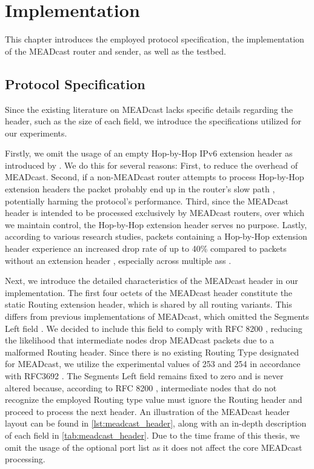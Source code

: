 \chapter{Implementation} %
\label{chap:Implementation}
This chapter introduces the employed protocol specification, the implementation
    of the MEADcast router and sender, as well as the testbed.

\section{Protocol Specification} %
\label{sec:Protocol Specification}
Since the existing literature on MEADcast lacks specific details regarding the
    header, such as the size of each field, we introduce the
    specifications utilized for our experiments.

Firstly, we omit the usage of an empty Hop-by-Hop IPv6 extension header as
    introduced by \citeauthor{meadcast1} \cite{meadcast1, meadcast2}.
We do this for several reasons:
First, to reduce the overhead of MEADcast.
Second, if a non-MEADcast router attempts to process Hop-by-Hop extension headers
    the packet probably end up in the router's slow path \cite{rfc7045}, potentially
    harming the protocol's performance.
Third, since the MEADcast header is intended to be processed exclusively by
    MEADcast routers, over which we maintain control, the Hop-by-Hop extension
    header serves no purpose.
Lastly, according to various research studies, packets containing a Hop-by-Hop
    extension header experience an increased drop rate of up to 40\% compared
    to packets without an extension header \cite{rfc7872_ext_hdrs_drop_rate},
    especially across multiple \glspl{as} \cite{rfc9098_ext_hdrs_op_impl, rfc9288}.

Next, we introduce the detailed characteristics of the MEADcast header in our
    implementation.
The first four octets of the MEADcast header constitute the static Routing
    extension header, which is shared by all routing variants.
This differs from previous implementations of MEADcast, which omitted the
    Segments Left field \cite{sdn_ba}.
We decided to include this field to comply with RFC 8200
    \cite{rfc8200_ipv6_hdr}, reducing the likelihood that intermediate nodes
    drop MEADcast packets due to a malformed Routing header.
Since there is no existing Routing Type designated for MEADcast, we utilize the
    experimental values of 253 and 254 in accordance with RFC3692
    \cite{rfc3692_ipv6_rt_type}.
The Segments Left field remains fixed to zero and is never altered because,
    according to RFC 8200 \cite{rfc8200_ipv6_hdr}, intermediate nodes that do
    not recognize the employed Routing type value must ignore the Routing
    header and proceed to process the next header.
An illustration of the MEADcast header layout can be found in
    \autoref{lst:meadcast_header}, along with an in-depth description of each
    field in \autoref{tab:meadcast_header}.
Due to the time frame of this thesis, we omit the usage of the optional port
    list as it does not affect the core MEADcast processing.

